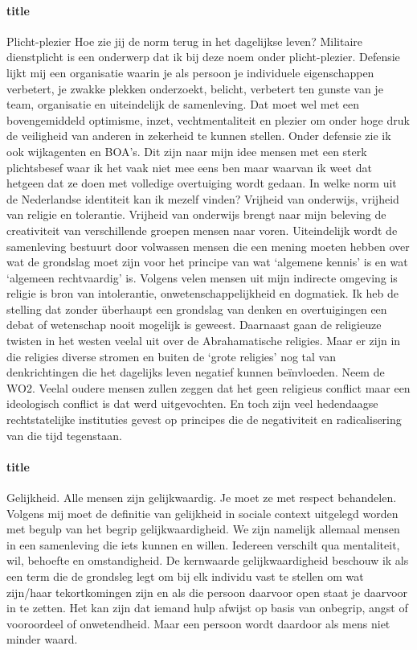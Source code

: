 \documentclass[11pt]{report}
\begin{document}
\paragraph{title}
Plicht-plezier
Hoe zie jij de norm terug in het dagelijkse leven?
Militaire dienstplicht is een onderwerp dat ik bij deze noem onder plicht-plezier. Defensie lijkt mij een organisatie waarin je als persoon je individuele eigenschappen verbetert, je zwakke plekken onderzoekt, belicht, verbetert ten gunste van je team, organisatie en uiteindelijk de samenleving. Dat moet wel met een bovengemiddeld optimisme, inzet, vechtmentaliteit en plezier om onder hoge druk de veiligheid van anderen in zekerheid te kunnen stellen. Onder defensie zie ik ook wijkagenten en BOA’s. Dit zijn naar mijn idee mensen met een sterk plichtsbesef waar ik het vaak niet mee eens ben maar waarvan ik weet dat hetgeen dat ze doen met volledige overtuiging wordt gedaan.
In welke norm uit de Nederlandse identiteit kan ik mezelf vinden? 
Vrijheid van onderwijs, vrijheid van religie en tolerantie. Vrijheid van onderwijs brengt naar mijn beleving de creativiteit van verschillende groepen mensen naar voren. Uiteindelijk wordt de samenleving bestuurt door volwassen mensen die een mening moeten hebben over wat de grondslag moet zijn voor het principe van wat ‘algemene kennis’ is en wat ‘algemeen rechtvaardig’ is.
Volgens velen mensen uit mijn indirecte omgeving is religie is bron van intolerantie, onwetenschappelijkheid en dogmatiek. Ik heb de stelling dat zonder überhaupt een grondslag van denken en overtuigingen een debat of wetenschap nooit mogelijk is geweest. Daarnaast gaan de religieuze twisten in het westen veelal uit over de Abrahamatische religies. Maar er zijn in die religies diverse stromen en buiten de ‘grote religies’ nog tal van denkrichtingen die het dagelijks leven negatief kunnen beïnvloeden. Neem de WO2. Veelal oudere mensen zullen zeggen dat het geen religieus conflict maar een ideologisch conflict is dat werd uitgevochten. En toch zijn veel hedendaagse rechtstatelijke instituties gevest op principes die de negativiteit en radicalisering van die tijd tegenstaan.
\paragraph{title}
Gelijkheid.
Alle mensen zijn gelijkwaardig. Je moet ze met respect behandelen. Volgens mij moet de definitie van gelijkheid in sociale context uitgelegd worden met begulp van het begrip gelijkwaardigheid. We zijn namelijk allemaal mensen in een samenleving die iets kunnen en willen. Iedereen verschilt qua mentaliteit, wil, behoefte en omstandigheid. De kernwaarde gelijkwaardigheid beschouw ik als een term die de grondsleg legt om bij elk individu vast te stellen om wat zijn/haar tekortkomingen zijn en als die persoon daarvoor open staat je daarvoor in te zetten. Het kan zijn dat iemand hulp afwijst op basis van onbegrip, angst of vooroordeel of onwetendheid. Maar een persoon wordt daardoor als mens niet minder waard.
\end{document}
